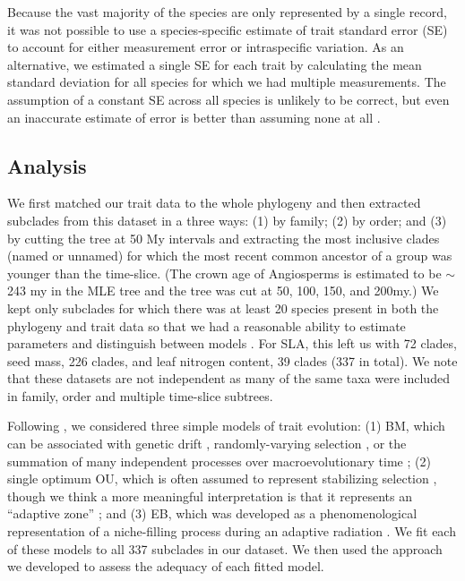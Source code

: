 Because the vast majority of the species are only represented by a single
record, it was not possible to use a species-specific estimate of
trait standard error (SE) to account for either measurement error or
intraspecific variation.  As an alternative, we estimated a single SE for each trait
by calculating the mean
standard deviation for all species for which we had multiple
measurements. The assumption of a constant SE across all species is
unlikely to be correct, but even an
inaccurate estimate of error is better than assuming none at all
\citep{Hansen2012SysBio}. 

\subsection{Analysis}

We first matched our trait data to the whole phylogeny and then extracted subclades from this dataset in a three ways: (1) by family; (2) by order; and (3) by cutting the tree at 50 My intervals and extracting the most inclusive clades (named or unnamed) for which the most recent common ancestor of a group was younger than the time-slice. 
(The crown age of Angiosperms is estimated to be $\sim$243 my in the MLE tree and the tree was cut at 50, 100, 150, and 200my.) We kept only subclades for which there was at least 20 species present in both the phylogeny and trait data so that we had a reasonable ability to estimate parameters and distinguish between models \citep{Boettiger2012, SlaterPennell}. 
For SLA, this left us with 72 clades, seed mass, 226 clades, and leaf nitrogen content, 39 clades (337 in total). We note that these datasets are not independent as many of the same taxa were included in family, order and multiple time-slice subtrees. 

Following \citet{Harmon2010}, we considered three simple models of trait evolution: (1) BM, which can be associated with genetic drift \citep{Lande1976, Felsenstein1988, LynchHill1986, Lynch1990, HansenMartins1996}, randomly-varying selection \citep{Felsenstein1973}, or the summation of many independent processes over macroevolutionary time \citep{HansenMartins1996, Uyeda2011, PennellPE}; (2) single optimum OU, which is often assumed to represent stabilizing selection \citep[following][]{Lande1976}, though we think a more meaningful interpretation is that it represents an ``adaptive zone'' \citep{Hansen2012book, PennellHarmon}; and (3) EB, which was developed as a phenomenological representation of a niche-filling process during an adaptive radiation \citep{Blomberg2003, Harmon2010}. We fit each of these models to all 337 subclades in our dataset. We then used the approach we developed to assess the adequacy of each fitted model. 

